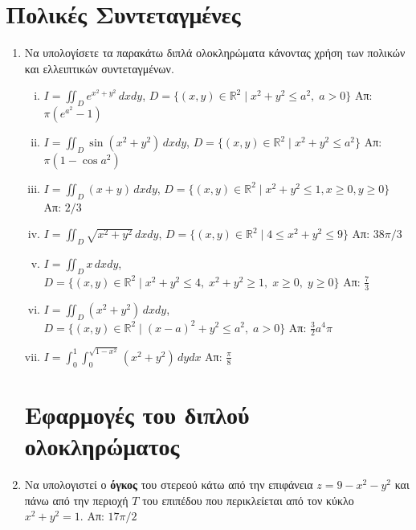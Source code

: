 \documentclass[a4paper,table]{report}
\begin{document}
\begin{center}
  \minibox{\large\bf \textcolor{Col1}{Ασκήσεις Διπλό Ολοκλήρωμα}}
\end{center}


\section*{Πολικές Συντεταγμένες}

\begin{enumerate}
  \item Να υπολογίσετε τα παρακάτω διπλά ολοκληρώματα κάνοντας χρήση των πολικών 
    και ελλειπτικών συντεταγμένων.
    \begin{enumerate}[i)]
      \item $I=\iint_{D}e^{x^2+y^2}\,dxdy$, 
        \quad $D=\{(x,y)\in\mathbb{R}^2 \mid x^2+y^2\leq a^2,\; a>0\}$ 
        \hfill Απ: $\pi(e^{a^2}-1)$ %
      \item $I=\iint_{D}\sin(x^2+y^2)\,dxdy$, \quad $D= \{(x,y)\in \mathbb{R}^{2} 
        \mid x^{2}+y^{2} \leq a^{2} \}$ 
        \hfill Απ: $\pi (1 - \cos{a^{2}}) $
      \item $I=\iint_{D}(x+y)\,dxdy$, \quad $ D= \{(x,y)\in \mathbb{R}^{2} 
        \mid x^{2}+y^{2} \leq 1, x \geq 0, y \geq 0 \} $ 
        \hfill Απ: $2/3$
      \item $I=\iint_{D}\sqrt{x^2+y^2}\,dxdy$, \quad $ D= \{(x,y)\in \mathbb{R}^{2} 
        \mid 4 \leq x^{2}+y^{2} \leq 9 \} $ 
        \hfill Απ: $38 \pi /3$
      \item $I=\iint_{D}x\,dxdy$, \quad $ D= \{(x,y)\in \mathbb{R}^{2} \mid x^{2}+y^{2} 
        \leq 4,\; x^{2}+y^{2} \geq 1,\; x \geq 0,\; y \geq 0 \} $ 
        \hfill Απ: $ \frac{7}{3} $ %
      \item $I=\iint_{D}(x^2+y^2)\,dxdy$, \quad $ D= \{(x,y)\in \mathbb{R}^{2} 
        \mid (x-a)^{2}+y^{2} \leq a^{2},\; a>0 \}  $ 
        \hfill Απ: $\frac{3}{2}a^4\pi$
      \item $I=\int_{0}^{1} \int _{0}^{\sqrt{1-x^{2}}} (x^2+y^2)\,dydx$ 
        \hfill Απ: $ \frac{\pi}{8} $ 
    \end{enumerate}


    \section*{Εφαρμογές του διπλού ολοκληρώματος} 

  \item Να υπολογιστεί ο \textbf{όγκος} του στερεού κάτω από την επιφάνεια
    $ z= 9- x^{2} -y^{2} $ και πάνω από την περιοχή $T$ του επιπέδου που 
    περικλείεται από τον κύκλο $ x^{2}+y^{2}=1 $.
    \hfill Απ: $ 17 \pi /2 $ 


\end{enumerate}
\end{document}
